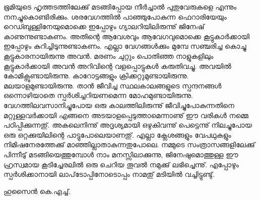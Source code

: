 ഭൂമിയുടെ ഹൃത്തടത്തിലേക്കു് മടങ്ങിപ്പോയ നീര്‍ച്ചാല്‍ പുതുവേരുകളെ എന്നും നനച്ചുകൊണ്ടിരിക്കും. ശരവേഗത്തില്‍ പാഞ്ഞുപോകുന്ന ഫെറാരിയേയും റെഡ്ബുള്ളിനേയുമൊക്കെ ഇപ്പോഴും ഗ്യാലറിയിലിരുന്നു് ജിനേഷ് കാണുന്നുണ്ടാകണം. അതിന്റെ ആവേശവും ആവേഗവുമൊക്കെ കൂട്ടുകാര്‍ക്കായി ഇപ്പോഴും കുറിച്ചിടുന്നുണ്ടാകണം. എല്ലാ വേഗങ്ങള്‍ക്കും മുമ്പേ സഞ്ചരിച്ച കൊച്ചു കൂട്ടുകാരനായിരുന്നു അവന്‍. മരണം ചുറ്റും പൊതിഞ്ഞ നാളുകളിലും കൂട്ടുകാര്‍ക്കായി അവന്‍ അറിവിന്റെ വളപ്പൊട്ടുകള്‍ കരുതിവച്ചു. അവയില്‍ കോമിക്സുണ്ടായിരുന്നു. കാറോട്ടങ്ങളും ക്രിക്കറ്റുമുണ്ടായിരുന്നു. മലയാളമുണ്ടായിരുന്നു. താന്‍ ജീവിച്ച സ്ഥലകാലങ്ങളുടെ സ്പന്ദനങ്ങള്‍ ഒന്നൊഴിയാതെ സ്പര്‍ശിച്ചറിയണമെന്ന മോഹമുണ്ടായിരുന്നു. വേഗത്തിലവസാനിച്ചുപോയ ഒരു കാലത്തിലിരുന്നു് ജീവിച്ചുപോകുന്നതിനെ മറ്റുള്ളവര്‍ക്കായി എങ്ങനെ അടയാളപ്പെടുത്താമെന്നാണു് ഈ വരികള്‍ നമ്മെ പഠിപ്പിക്കുന്നതു്. അകലെനിന്നു് അദൃശ്യമായി ഒഴുകിവന്നു് പെട്ടെന്നു് നിലച്ചുപോയ ഒരു ഒറ്റക്കുയിലിന്റെ പാട്ടുപോലെയാണതു്. എല്ലാ ക്ലേശങ്ങളും വേപഥുകളും നിമിഷനേരത്തേക്കു് മാഞ്ഞില്ലാതാകുന്നതുപോലെ. നമ്മുടെ സംത്രാസങ്ങളിലേക്കു് പിന്നീടു് മടങ്ങിയെത്തുമ്പോള്‍ നാം മനസ്സിലാക്കുന്നു, ജിനേഷുമൊത്തുള്ള ഈ ഹ്രസ്വമായ കൂടിച്ചേരലില്‍ ഒരു ചെറിയ തൂവല്‍ നമുക്കു് ലഭിച്ചെന്നു്. എപ്പോഴും സ്പര്‍ശിക്കാനായി ലാപ്‌ടോപ്പിനോടൊപ്പം നാമതു് മടിയില്‍ വച്ചിട്ടുണ്ടു്.

\begin{flushright}ഹുസൈന്‍ കെ.എച്ച്. \end{flushright}
\newpage
